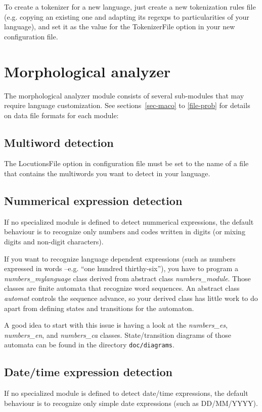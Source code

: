 \documentclass[a4paper]{book}
\begin{document}
  To create a tokenizer for a new language, just create a new
  tokenization rules file (e.g. copying an existing one and adapting 
  its regexps to particularities of your language), and set 
  it as the value for the TokenizerFile option in your new 
  configuration file.

  \section{Morphological analyzer}
   The morphological analyzer module consists of several sub-modules
   that may require language customization. See
   sections~\ref{sec-maco} to \ref{file-prob} for details on data file formats for each
   module:

   \subsection{Multiword detection} 
    The LocutionsFile option in
    configuration file must be set to the name of a file that contains
    the multiwords you want to detect in your language. 

   \subsection{Nummerical expression detection} 
    If no specialized module is defined to detect nummerical
    expressions, the default behaviour is to recognize only numbers
    and codes written in digits (or mixing digits and non-digit
    characters).
  
    If you want to recognize language dependent expressions (such as
    numbers expressed in words --e.g. ``one hundred thirthy-six''),
    you have to program a {\em numbers\_mylanguage} class derived from
    abstract class {\em numbers\_module}.  Those classes are finite
    automata that recognize word sequences. An abstract class {\em
    automat} controls the sequence advance, so your derived class has
    little work to do apart from defining states and transitions for
    the automaton.

    A good idea to start with this issue is having a look at the 
    {\em numbers\_es}, {\em numbers\_en}, and {\em numbers\_ca} classes.
    State/transition diagrams of those automata can be found in the
    directory {\tt doc/diagrams}.
 
   \subsection{Date/time expression detection} 
    If no specialized module is defined to detect date/time
    expressions, the default behaviour is to recognize only simple
    date expressions (such as DD/MM/YYYY).
  
\end{document}
